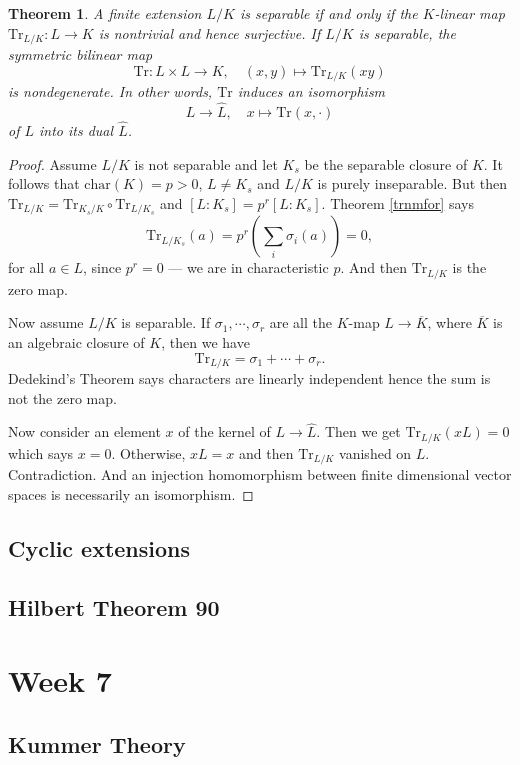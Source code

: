 \documentclass[12pt]{report}
\newtheorem{thm}{Theorem}[section]
\theoremstyle{definition}
\def\Tr{\text{Tr}}
\def\char{\text{char}}
\def\ok{\overline{K}}
\begin{document}
\begin{thm}
    A finite extension $L/K$ is separable if and only if the $K$-linear map $\Tr_{L/K}: L\to K$ is nontrivial and hence surjective. If $L/K$ is separable, the symmetric bilinear map $$\Tr:L\times L\to K,\quad (x,y)\mapsto \Tr_{L/K}(xy)$$ is nondegenerate. In other words, $\Tr$ induces an isomorphism $$L\to \hat{L}, \quad x\mapsto \Tr(x,\cdot)$$ of $L$ into its dual $\hat{L}$.
\end{thm}

\begin{proof}
    Assume $L/K$ is not separable and let $K_s$ be the separable closure of $K$. It follows that $\char(K)=p>0$, $L\not=K_s$ and $L/K$ is purely inseparable. But then $\Tr_{L/K} =\Tr_{K_s/K} \circ\Tr_{L/K_s}$ and $[L:K_s]=p^r [L:K_s]$. Theorem \ref{trnmfor} says $$\Tr_{L/K_s}(a)=p^r(\sum_i \sigma_i(a))=0,$$ for all $a\in L$, since $p^r=0$ --- we are in characteristic $p$. And then $\Tr_{L/K}$ is the zero map.


    
    Now assume $L/K$ is separable. If $\sigma_1,\cdots,\sigma_r$ are all the $K$-map $L\to\overline{K}$, where $\ok$ is an algebraic closure of $K$, then we have $$\Tr_{L/K}=\sigma_1+\cdots+\sigma_r.$$ Dedekind's Theorem says characters are linearly independent hence the sum is not the zero map.


    Now consider an element $x$ of the kernel of $L\to \hat{L}$. Then we get $\Tr_{L/K}(xL)=0$ which says $x=0$. Otherwise, $xL=x$ and then $\Tr_{L/K}$ vanished on $L$. Contradiction. And an injection homomorphism between finite dimensional vector spaces is necessarily an isomorphism. 
\end{proof}

\section{Cyclic extensions}

\section{Hilbert Theorem 90}


\chapter*{Week 7}
\setcounter{chapter}{7}

\section{Kummer Theory}
\end{document}
